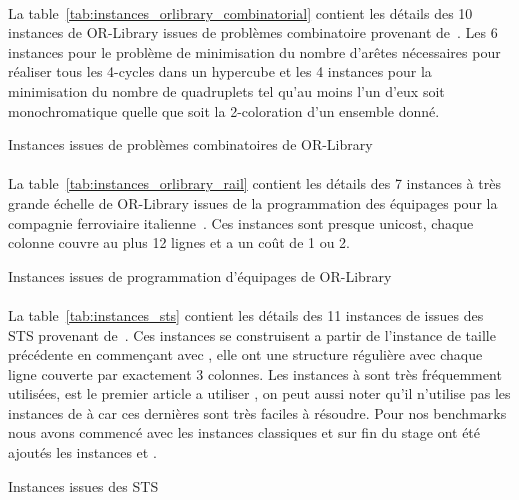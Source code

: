 \documentclass[a4paper,11pt,twoside,french,report]{../common/simplem}
\begin{document}
				\paragraph*{}
					La table~\ref{tab:instances_orlibrary_combinatorial} contient les détails des 10 instances de OR-Library issues de problèmes combinatoire provenant de~\cite{Grossman1997}. Les 6 instances  pour le problème de minimisation du nombre d'arêtes nécessaires pour réaliser tous les 4-cycles dans un hypercube et les 4 instances  pour la minimisation du nombre de quadruplets tel qu'au moins l'un d'eux soit monochromatique quelle que soit la 2-coloration d'un ensemble donné.
				\begin{table}[H]
					\centering
					\caption{Instances issues de problèmes combinatoires de OR-Library}
					\label{tab:instances_orlibrary_combinatorial}
					
				\end{table}
				\paragraph*{}
					La table~\ref{tab:instances_orlibrary_rail} contient les détails des 7 instances à très grande échelle de OR-Library issues de la programmation des équipages pour la compagnie ferroviaire italienne~\cite{Caprara2000}. Ces instances sont presque unicost, chaque colonne couvre au plus 12 lignes et a un coût de 1 ou 2.
				\begin{table}[H]
					\centering
					\caption{Instances issues de programmation d'équipages de OR-Library}
					\label{tab:instances_orlibrary_rail}
					
				\end{table}
				\paragraph*{}
					La table~\ref{tab:instances_sts} contient les détails des 11 instances de issues des \gls{STS} provenant de~\cite{Fulkerson1974}. Ces instances se construisent a partir de l'instance de taille précédente en commençant avec , elle ont une structure régulière avec chaque ligne couverte par exactement 3 colonnes. Les instances  à  sont très fréquemment utilisées, \cite{Gao2015} est le premier article a utiliser , on peut aussi noter qu'il n'utilise pas les instances de  à  car ces dernières sont très faciles à résoudre. Pour nos benchmarks nous avons commencé avec les instances classiques et sur fin du stage ont été ajoutés les instances  et .
				\begin{table}[H]
					\centering
					\caption{Instances issues des \acrshort{STS}}
					\label{tab:instances_sts}
					
				\end{table}
	\printbibliography[heading=bibintoc]{}
	\printglossary[type=\acronymtype,nogroupskip=true,title=Lexique,toctitle=Lexique]{}
\end{document}
